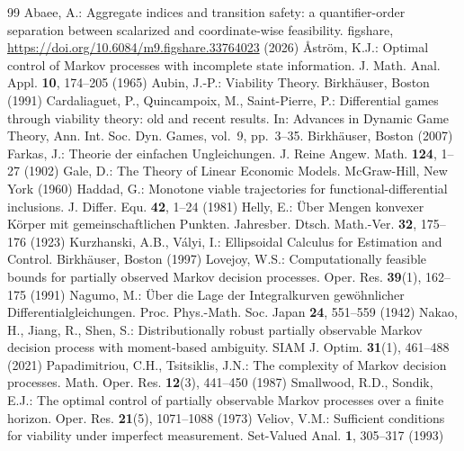 \renewcommand{\refname}{References}
\begin{thebibliography}{99}
\small
{} Abaee, A.: Aggregate indices and transition safety: a quantifier-order separation between scalarized and coordinate-wise feasibility. figshare, \url{https://doi.org/10.6084/m9.figshare.33764023} (2026)
 \r{A}str\"om, K.J.: Optimal control of Markov processes with incomplete state information. J. Math. Anal. Appl. \textbf{10}, 174--205 (1965)
 Aubin, J.-P.: Viability Theory. Birkh\"auser, Boston (1991)
 Cardaliaguet, P., Quincampoix, M., Saint-Pierre, P.: Differential games through viability theory: old and recent results. In: Advances in Dynamic Game Theory, Ann. Int. Soc. Dyn. Games, vol.~9, pp.~3--35. Birkh\"auser, Boston (2007)
 Farkas, J.: Theorie der einfachen Ungleichungen. J. Reine Angew. Math. \textbf{124}, 1--27 (1902)
 Gale, D.: The Theory of Linear Economic Models. McGraw-Hill, New York (1960)
 Haddad, G.: Monotone viable trajectories for functional-differential inclusions. J. Differ. Equ. \textbf{42}, 1--24 (1981)
 Helly, E.: \"Uber Mengen konvexer K\"orper mit gemeinschaftlichen Punkten. Jahresber. Dtsch. Math.-Ver. \textbf{32}, 175--176 (1923)
 Kurzhanski, A.B., V\'alyi, I.: Ellipsoidal Calculus for Estimation and Control. Birkh\"auser, Boston (1997)
 Lovejoy, W.S.: Computationally feasible bounds for partially observed Markov decision processes. Oper. Res. \textbf{39}(1), 162--175 (1991)
 Nagumo, M.: \"Uber die Lage der Integralkurven gew\"ohnlicher Differentialgleichungen. Proc. Phys.-Math. Soc. Japan \textbf{24}, 551--559 (1942)
 Nakao, H., Jiang, R., Shen, S.: Distributionally robust partially observable Markov decision process with moment-based ambiguity. SIAM J. Optim. \textbf{31}(1), 461--488 (2021)
 Papadimitriou, C.H., Tsitsiklis, J.N.: The complexity of Markov decision processes. Math. Oper. Res. \textbf{12}(3), 441--450 (1987)
 Smallwood, R.D., Sondik, E.J.: The optimal control of partially observable Markov processes over a finite horizon. Oper. Res. \textbf{21}(5), 1071--1088 (1973)
 Veliov, V.M.: Sufficient conditions for viability under imperfect measurement. Set-Valued Anal. \textbf{1}, 305--317 (1993)
\end{thebibliography}


